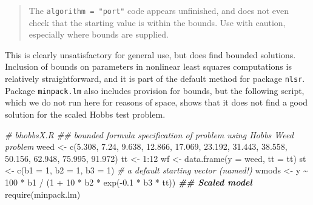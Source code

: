 \documentclass[
]{article}
\newenvironment{Shaded}{\begin{snugshade}}{\end{snugshade}}
\newcommand{\AttributeTok}[1]{\textcolor[rgb]{0.77,0.63,0.00}{#1}}
\newcommand{\CommentTok}[1]{\textcolor[rgb]{0.56,0.35,0.01}{\textit{#1}}}
\newcommand{\DecValTok}[1]{\textcolor[rgb]{0.00,0.00,0.81}{#1}}
\newcommand{\DocumentationTok}[1]{\textcolor[rgb]{0.56,0.35,0.01}{\textbf{\textit{#1}}}}
\newcommand{\FloatTok}[1]{\textcolor[rgb]{0.00,0.00,0.81}{#1}}
\newcommand{\FunctionTok}[1]{\textcolor[rgb]{0.00,0.00,0.00}{#1}}
\newcommand{\NormalTok}[1]{#1}
\newcommand{\OtherTok}[1]{\textcolor[rgb]{0.56,0.35,0.01}{#1}}
\newcommand{\SpecialCharTok}[1]{\textcolor[rgb]{0.00,0.00,0.00}{#1}}
\begin{document}
\begin{quote}
The \texttt{algorithm\ =\ "port"} code appears unfinished, and does not
even check that the starting value is within the bounds. Use with
caution, especially where bounds are supplied.
\end{quote}

This is clearly unsatisfactory for general use, but does find bounded
solutions. Inclusion of bounds on parameters in nonlinear least squares
computations is relatively straightforward, and it is part of the
default method for package \texttt{nlsr}. Package \texttt{minpack.lm}
also includes provision for bounds, but the following script, which we
do not run here for reasons of space, shows that it does not find a good
solution for the scaled Hobbs test problem.

\begin{Shaded}
\begin{Highlighting}[]
\CommentTok{\# bhobbsX.R \#\# bounded formula specification of problem using Hobbs Weed problem}
\NormalTok{weed }\OtherTok{\textless{}{-}} \FunctionTok{c}\NormalTok{(}\FloatTok{5.308}\NormalTok{, }\FloatTok{7.24}\NormalTok{, }\FloatTok{9.638}\NormalTok{, }\FloatTok{12.866}\NormalTok{, }\FloatTok{17.069}\NormalTok{, }\FloatTok{23.192}\NormalTok{, }\FloatTok{31.443}\NormalTok{,}
          \FloatTok{38.558}\NormalTok{, }\FloatTok{50.156}\NormalTok{, }\FloatTok{62.948}\NormalTok{, }\FloatTok{75.995}\NormalTok{, }\FloatTok{91.972}\NormalTok{)}
\NormalTok{tt }\OtherTok{\textless{}{-}} \DecValTok{1}\SpecialCharTok{:}\DecValTok{12}
\NormalTok{wf }\OtherTok{\textless{}{-}} \FunctionTok{data.frame}\NormalTok{(}\AttributeTok{y =}\NormalTok{ weed, }\AttributeTok{tt =}\NormalTok{ tt)}
\NormalTok{st }\OtherTok{\textless{}{-}} \FunctionTok{c}\NormalTok{(}\AttributeTok{b1 =} \DecValTok{1}\NormalTok{, }\AttributeTok{b2 =} \DecValTok{1}\NormalTok{, }\AttributeTok{b3 =} \DecValTok{1}\NormalTok{) }\CommentTok{\# a default starting vector (named!)}
\NormalTok{wmods }\OtherTok{\textless{}{-}}\NormalTok{ y }\SpecialCharTok{\textasciitilde{}} \DecValTok{100} \SpecialCharTok{*}\NormalTok{ b1 }\SpecialCharTok{/}\NormalTok{ (}\DecValTok{1} \SpecialCharTok{+} \DecValTok{10} \SpecialCharTok{*}\NormalTok{ b2 }\SpecialCharTok{*} \FunctionTok{exp}\NormalTok{(}\SpecialCharTok{{-}}\FloatTok{0.1} \SpecialCharTok{*}\NormalTok{ b3 }\SpecialCharTok{*}\NormalTok{ tt)) }\DocumentationTok{\#\# Scaled model}
\FunctionTok{require}\NormalTok{(minpack.lm)}
\end{Highlighting}
\end{Shaded}
\end{document}
